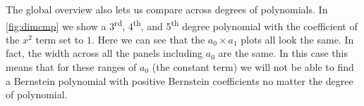 The global overview also lets us compare across degrees of polynomials.
In \autoref{fig:dimcmp} we show a 3\textsuperscript{rd}, 4\textsuperscript{th},
and 5\textsuperscript{th} degree polynomial with the coefficient of the $x^2$
term set to $1$. Here we can see that the $a_0 \times a_1$ plots all look the same.
In fact, the width across all the panels including $a_0$ are the same. In this
case this means that for these ranges of $a_0$ (the constant term) we will not
be able to find a Bernstein polynomial with positive Bernstein coefficients
no matter the degree of polynomial. 


